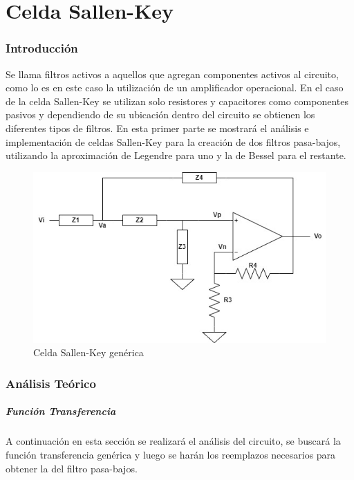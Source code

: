 \documentclass[11pt, a4paper]{article}
\begin{document}
\part{Celda Sallen-Key} 
\section{Introducción}
	Se llama filtros activos a aquellos que agregan componentes activos al circuito, como lo es en este caso la utilización de un amplificador operacional. En el caso de la celda Sallen-Key se utilizan solo resistores y capacitores como componentes pasivos y dependiendo de su ubicación dentro del circuito se obtienen los diferentes tipos de filtros.
	En esta primer parte se mostrará el análisis e implementación de celdas Sallen-Key para la creación de dos filtros pasa-bajos, utilizando la aproximación de Legendre para uno y la de Bessel para el restante.
	
\begin{figure}[H]
	\centering
	\includegraphics[scale=0.5]{sallenkeygenerico.jpg}
	\caption{Celda Sallen-Key genérica}
	\label{fig:sallenkeygenerica}
\end{figure}
	
\section{Análisis Teórico}

\subsubsection{Función Transferencia}
	A continuación en esta sección se realizará el análisis del circuito, se buscará la función transferencia genérica y luego se harán los reemplazos necesarios para obtener la del filtro pasa-bajos.
	
\end{document}
